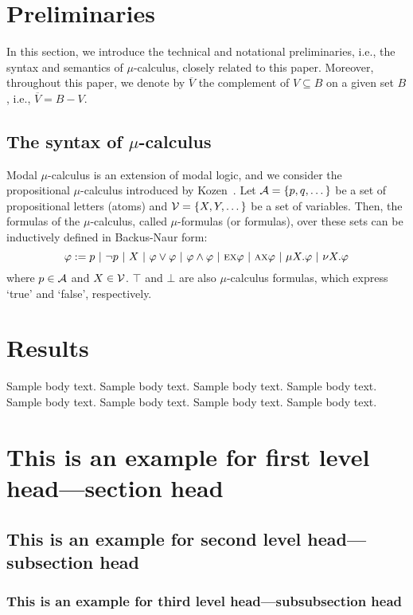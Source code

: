 \documentclass[sn-mathphys]{sn-jnl}%
\theoremstyle{thmstyleone}%
\theoremstyle{thmstyletwo}%
\theoremstyle{thmstylethree}%
\begin{document}
\section{Preliminaries}  \label{preliminaries}
In this section, we introduce the technical and notational preliminaries, i.e., the  syntax and semantics of $\mu$-calculus, closely related to this paper.
Moreover, throughout this paper, we denote by $\overline V$ the complement of $V \subseteq B$ on a given set $B$, i.e., $\overline V = B -V$.

\subsection{The syntax of $\mu$-calculus}\label{mu-suntax}
Modal $\mu$-calculus is an extension of modal logic, and we consider the propositional $\mu$-calculus introduced by Kozen~\cite{DBLP:journals/cacm/Kozen83}.
Let ${\cal A}=\{p,q,\dots\}$ be a set of propositional letters (atoms) and ${\cal V}=\{X, Y, \dots\}$ be a set of variables.
Then, the formulas of the $\mu$-calculus, called $\mu$-formulas (or formulas), over these sets can be inductively defined in Backus-Naur form:
\[
\varphi := p\ |\ \neg p\ |\ X\ |\ \varphi \vee \varphi\ |\ \varphi \wedge \varphi \ |\ \EXIST\NEXT \varphi\ |\ \ALL\NEXT \varphi\ |\ \mu X. \varphi\ |\ \nu X. \varphi
\]
where $p\in {\cal A}$ and $X\in {\cal V}$. $\top$ and $\bot$ are also $\mu$-calculus formulas, which express `true' and `false', respectively.
\section{Results}\label{sec2}

Sample body text. Sample body text. Sample body text. Sample body text. Sample body text. Sample body text. Sample body text. Sample body text.

\section{This is an example for first level head---section head}\label{sec3}

\subsection{This is an example for second level head---subsection head}\label{subsec2}

\subsubsection{This is an example for third level head---subsubsection head}\label{subsubsec2}
\end{document}
